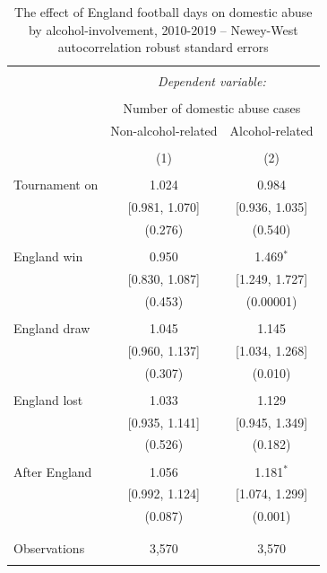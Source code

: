 \documentclass[12pt, a4paper]{article}
\begin{document}
\begin{table}[!htbp] \centering 
  \begin{threeparttable}
  \caption{The effect of England football days on domestic abuse by alcohol-involvement, 2010-2019 -- Newey-West autocorrelation robust standard errors} 
  \label{coremodelnw} 
\begin{tabular}{@{\extracolsep{5pt}}lcc} 
\\[-1.8ex]\hline 
\hline \\[-1.8ex] 
  & \multicolumn{2}{c}{\textit{Dependent variable:}} \\ 
\cline{2-3} 
\\[-1.8ex] & \multicolumn{2}{c}{Number of domestic abuse cases} \\ 
 & Non-alcohol-related & Alcohol-related\\ 
\\[-1.8ex] & (1) & (2)\\ 
\hline \\[-1.8ex] 
 Tournament on & 1.024 & 0.984 \\ 
  & [0.981, 1.070] & [0.936, 1.035] \\ 
  & (0.276) & (0.540) \\ 
  & & \\ 
 England win & 0.950 & 1.469$^{*}$ \\ 
  & [0.830, 1.087] & [1.249, 1.727] \\ 
  & (0.453) & (0.00001) \\ 
  & & \\ 
 England draw & 1.045 & 1.145 \\ 
  & [0.960, 1.137] & [1.034, 1.268] \\ 
  & (0.307) & (0.010) \\ 
  & & \\ 
 England lost & 1.033 & 1.129 \\ 
  & [0.935, 1.141] & [0.945, 1.349] \\ 
  & (0.526) & (0.182) \\ 
  & & \\ 
  After England & 1.056 & 1.181$^{*}$ \\ 
  & [0.992, 1.124] & [1.074, 1.299] \\ 
  & (0.087) & (0.001) \\ 
  & & \\ 
\hline \\[-1.8ex] 
Observations & 3,570 & 3,570 \\ 
\hline 
\hline \\[-1.8ex] 


\end{tabular}
\end{threeparttable}
\end{table}
\end{document}
